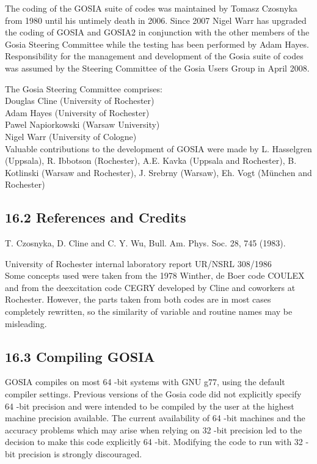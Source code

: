 \documentclass[10pt]{article}
\begin{document}
The coding of the GOSIA suite of codes was maintained by Tomasz Czosnyka from 1980 until his untimely death in 2006. Since 2007 Nigel Warr has upgraded the coding of GOSIA and GOSIA2 in conjunction with the other members of the Gosia Steering Committee while the testing has been performed by Adam Hayes. Responsibility for the management and development of the Gosia suite of codes was assumed by the Steering Committee of the Gosia Users Group in April 2008.

The Gosia Steering Committee comprises:\\
Douglas Cline (University of Rochester)\\
Adam Hayes (University of Rochester)\\
Pawel Napiorkowski (Warsaw University)\\
Nigel Warr (University of Cologne)\\
Valuable contributions to the development of GOSIA were made by L. Hasselgren (Uppsala), R. Ibbotson (Rochester), A.E. Kavka (Uppsala and Rochester), B. Kotlinski (Warsaw and Rochester), J. Srebrny (Warsaw), Eh. Vogt (München and Rochester)

\subsection*{16.2 References and Credits}
T. Czosnyka, D. Cline and C. Y. Wu, Bull. Am. Phys. Soc. 28, 745 (1983).

University of Rochester internal laboratory report UR/NSRL 308/1986\\
Some concepts used were taken from the 1978 Winther, de Boer code COULEX and from the deexcitation code CEGRY developed by Cline and coworkers at Rochester. However, the parts taken from both codes are in most cases completely rewritten, so the similarity of variable and routine names may be misleading.

\subsection*{16.3 Compiling GOSIA}
GOSIA compiles on most 64 -bit systems with GNU g77, using the default compiler settings. Previous versions of the Gosia code did not explicitly specify 64 -bit precision and were intended to be compiled by the user at the highest machine precision available. The current availability of 64 -bit machines and the accuracy problems which may arise when relying on 32 -bit precision led to the decision to make this code explicitly 64 -bit. Modifying the code to run with 32 -bit precision is strongly discouraged.
\end{document}
